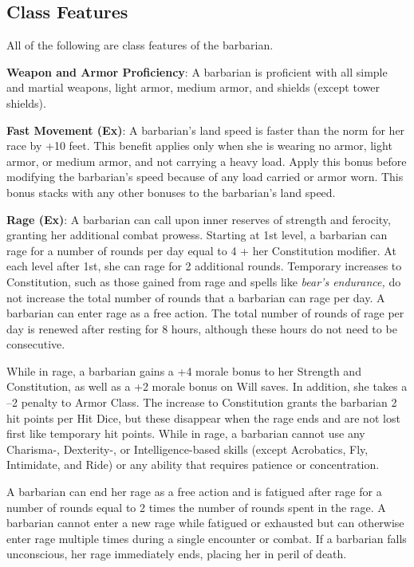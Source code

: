 				
\subsection{Class Features}

				
All of the following are class features of the barbarian.
				
\textbf{Weapon and Armor Proficiency}: A barbarian is proficient with all simple and martial weapons, light armor, medium armor, and shields (except tower shields).
				
\textbf{Fast Movement (Ex)}: A barbarian's land speed is faster than the norm for her race by +10 feet. This benefit applies only when she is wearing no armor, light armor, or medium armor, and not carrying a heavy load. Apply this bonus before modifying the barbarian's speed because of any load carried or armor worn. This bonus stacks with any other bonuses to the barbarian's land speed.
				
\textbf{Rage (Ex)}: A barbarian can call upon inner reserves of strength and ferocity, granting her additional combat prowess. Starting at 1st level, a barbarian can rage for a number of rounds per day equal to 4 + her Constitution modifier. At each level after 1st, she can rage for 2 additional rounds. Temporary increases to Constitution, such as those gained from rage and spells like \textit{bear's endurance,} do not increase the total number of rounds that a barbarian can rage per day. A barbarian can enter rage as a free action. The total number of rounds of rage per day is renewed after resting for 8 hours, although these hours do not need to be consecutive.
				
While in rage, a barbarian gains a +4 morale bonus to her Strength and Constitution, as well as a +2 morale bonus on Will saves. In addition, she takes a --2 penalty to Armor Class. The increase to Constitution grants the barbarian 2 hit points per Hit Dice, but these disappear when the rage ends and are not lost first like temporary hit points. While in rage, a barbarian cannot use any Charisma-, Dexterity-, or Intelligence-based skills (except Acrobatics, Fly, Intimidate, and Ride) or any ability that requires patience or concentration.
				
A barbarian can end her rage as a free action and is fatigued after rage for a number of rounds equal to 2 times the number of rounds spent in the rage. A barbarian cannot enter a new rage while fatigued or exhausted but can otherwise enter rage multiple times during a single encounter or combat. If a barbarian falls unconscious, her rage immediately ends, placing her in peril of death.
				
